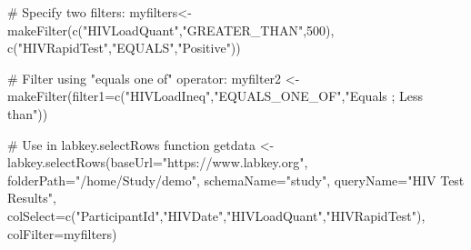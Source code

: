 \begin{SeeAlso}\relax
{}
\end{SeeAlso}
\begin{Examples}
\begin{ExampleCode}

# Specify two filters:
myfilters<- makeFilter(c("HIVLoadQuant","GREATER_THAN",500), c("HIVRapidTest","EQUALS","Positive"))

# Filter using "equals one of" operator:
myfilter2 <- makeFilter(filter1=c("HIVLoadIneq","EQUALS_ONE_OF","Equals ; Less than"))

# Use in labkey.selectRows function
getdata <- labkey.selectRows(baseUrl="https://www.labkey.org", folderPath="/home/Study/demo", 
schemaName="study", queryName="HIV Test Results", 
colSelect=c("ParticipantId","HIVDate","HIVLoadQuant","HIVRapidTest"), colFilter=myfilters)


\end{ExampleCode}
\end{Examples}

